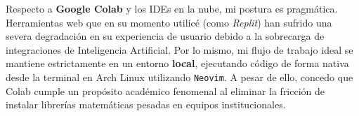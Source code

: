 \documentclass[11pt]{article}
\begin{document}
Respecto a \textbf{Google Colab} y los IDEs en la nube, mi postura es pragmática. Herramientas web que en su momento utilicé (como \textit{Replit}) han sufrido una severa degradación en su experiencia de usuario debido a la sobrecarga de integraciones de Inteligencia Artificial. Por lo mismo, mi flujo de trabajo ideal se mantiene estrictamente en un entorno \textbf{local}, ejecutando código de forma nativa desde la terminal en Arch Linux utilizando \texttt{Neovim}. A pesar de ello, concedo que Colab cumple un propósito académico fenomenal al eliminar la fricción de instalar librerías matemáticas pesadas en equipos institucionales.
\end{document}
